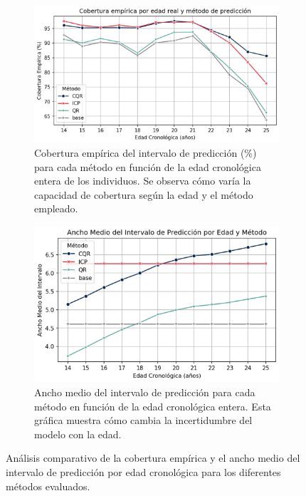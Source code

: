 \begin{figure}[h]
    \centering

    \begin{subfigure}[b]{0.9\textwidth}
        \centering
        \includegraphics[width=\textwidth]{capitulos/cap_05/imagenes/AE_EC_by_true_age.png}
        \caption{
            Cobertura empírica del intervalo de predicción (\%) para cada método en función de la edad cronológica entera de los individuos. Se observa cómo varía la capacidad de cobertura según la edad y el método empleado.
        }
        \label{fig:AE_EC_by_true_age}
    \end{subfigure}

    \vspace{0.5cm}
    
    \begin{subfigure}[b]{0.9\textwidth}
        \centering
        \includegraphics[width=\textwidth]{capitulos/cap_05/imagenes/AE_MPIW_by_true_age.png}
        \caption{
            Ancho medio del intervalo de predicción para cada método en función de la edad cronológica entera. Esta gráfica muestra cómo cambia la incertidumbre del modelo con la edad.
        }
        \label{fig:AE_MPIW_by_true_age}
    \end{subfigure}

    \caption[
        Análisis comparativo de la cobertura empírica y el ancho medio del intervalo de predicción por edad cronológica para los diferentes métodos evaluados.
    ]{
        Análisis comparativo de la cobertura empírica y el ancho medio del intervalo de predicción por edad cronológica para los diferentes métodos evaluados.
    }
    \label{fig:AE_EC_MPIW_by_true_age}
\end{figure}

